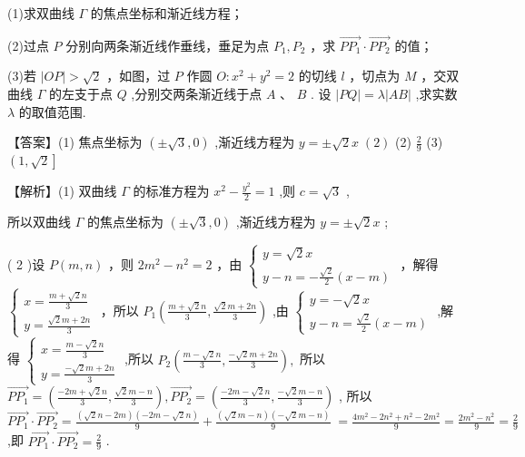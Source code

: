 \documentclass[10pt]{article}
\begin{document}
(1)求双曲线 \(\Gamma\) 的焦点坐标和渐近线方程；

(2)过点 \(P\) 分别向两条渐近线作垂线，垂足为点 \({P}_{1},{P}_{2}\) ，求 \(\overrightarrow{P{P}_{1}} \cdot  \overrightarrow{P{P}_{2}}\) 的值；

(3)若 \(\left| {OP}\right|  > \sqrt{2}\) ，如图，过 \(P\) 作圆 \(O : {x}^{2} + {y}^{2} = 2\) 的切线 \(l\) ，切点为 \(M\) ，交双曲线 \(\Gamma\) 的左支于点 \(Q\) ,分别交两条渐近线于点 \(A\text{ 、 }B\) . 设 \(\left| {PQ}\right|  = \lambda \left| {AB}\right|\) ,求实数 \(\lambda\) 的取值范围.

【答案】(1) 焦点坐标为 \(\left( {\pm \sqrt{3},0}\right)\) ,渐近线方程为 \(y =  \pm  \sqrt{2}x\;\left( 2\right)\) (2) \(\frac{2}{9}\) (3) \(\left( {1,\sqrt{2}}\right\rbrack\)

【解析】(1) 双曲线 \(\Gamma\) 的标准方程为 \({x}^{2} - \frac{{y}^{2}}{2} = 1\) ,则 \(c = \sqrt{3}\) ,

所以双曲线 \(\Gamma\) 的焦点坐标为 \(\left( {\pm \sqrt{3},0}\right)\) ,渐近线方程为 \(y =  \pm  \sqrt{2}x\) ;

( 2 )设 \(P\left( {m,n}\right)\) ，则 \(2{m}^{2} - {n}^{2} = 2\) ，由 \(\left\{  \begin{array}{l} y = \sqrt{2}x \\  y - n =  - \frac{\sqrt{2}}{2}\left( {x - m}\right)  \end{array}\right.\) ，解得 \(\left\{  \begin{array}{l} x = \frac{m + \sqrt{2}n}{3} \\  y = \frac{\sqrt{2}m + {2n}}{3} \end{array}\right.\) ，所以 \({P}_{1}\left( {\frac{m + \sqrt{2}n}{3},\frac{\sqrt{2}m + {2n}}{3}}\right)\) ,由 \(\left\{  \begin{array}{l} y =  - \sqrt{2}x \\  y - n = \frac{\sqrt{2}}{2}\left( {x - m}\right)  \end{array}\right.\) ,解得 \(\left\{  \begin{array}{l} x = \frac{m - \sqrt{2}n}{3} \\  y = \frac{-\sqrt{2}m + {2n}}{3} \end{array}\right.\) ,所以 \({P}_{2}\left( {\frac{m - \sqrt{2}n}{3},\frac{-\sqrt{2}m + {2n}}{3}}\right) ,\) 所以 \(\overrightarrow{P{P}_{1}} = \left( {\frac{-{2m} + \sqrt{2}n}{3},\frac{\sqrt{2}m - n}{3}}\right) ,\overrightarrow{P{P}_{2}} = \left( {\frac{-{2m} - \sqrt{2}n}{3},\frac{-\sqrt{2}m - n}{3}}\right)\) , 所以 \(\overrightarrow{P{P}_{1}} \cdot  \overrightarrow{P{P}_{2}} = \frac{\left( {\sqrt{2}n - {2m}}\right) \left( {-{2m} - \sqrt{2}n}\right) }{9} + \frac{\left( {\sqrt{2}m - n}\right) \left( {-\sqrt{2}m - n}\right) }{9} \; = \frac{4{m}^{2} - 2{n}^{2} + {n}^{2} - 2{m}^{2}}{9} = \frac{2{m}^{2} - {n}^{2}}{9} = \frac{2}{9}\) ,即 \(\overrightarrow{P{P}_{1}} \cdot  \overrightarrow{P{P}_{2}} = \frac{2}{9}\) .
\end{document}

